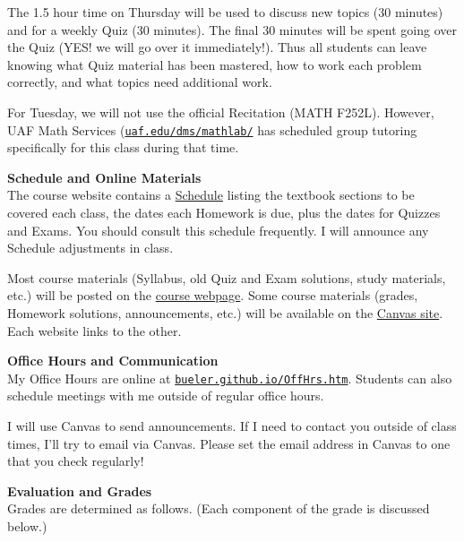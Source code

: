 \documentclass[12pt]{article}
\renewcommand{\emph}[1]{\textsf{\textbf{#1}}}
\newcommand{\localhead}[1]{\par\smallskip\textbf{#1} \smallskip\nobreak\\}%
\def\heading#1{\localhead{\large\emph{#1}}}
\begin{document}
The 1.5 hour time on Thursday will be used to discuss new topics (30 minutes) and for a weekly Quiz (30 minutes).  The final 30 minutes will be spent going over the Quiz (YES! we will go over it immediately!).  Thus all students can leave knowing what Quiz material has been mastered, how to work each problem correctly, and what topics need additional work. 

For Tuesday, we will not use the official Recitation (MATH F252L).  However, UAF Math Services (\href{https://uaf.edu/dms/mathlab/}{\texttt{uaf.edu/dms/mathlab/}} has scheduled group tutoring specifically for this class during that time.


\clearpage \newpage

\strut \vspace{-12pt}
\heading{Schedule and Online Materials}
The course website contains a \href{https://bueler.github.io/calc2/schedule.pdf}{Schedule} listing the textbook sections to be covered each class, the dates each Homework is due, plus the dates for Quizzes and Exams. You should consult this schedule frequently.  I will announce any Schedule adjustments in class.

Most course materials (Syllabus, old Quiz and Exam solutions, study materials, etc.) will be posted on the \href{https://bueler.github.io/calc2/}{course webpage}.  Some course materials (grades, Homework solutions, announcements, etc.) will be available on the \href{https://canvas.alaska.edu/courses/7049}{Canvas site}.  Each website links to the other.


\heading{Office Hours and Communication}
My Office Hours are online at \href{http://bueler.github.io/OffHrs.htm}{\texttt{bueler.github.io/OffHrs.htm}}.  Students can also schedule meetings with me outside of regular office hours. 

I will use Canvas to send announcements.  If I need to contact you outside of class times, I'll try to email via Canvas.  Please set the email address in Canvas to one that you check regularly!


\heading{Evaluation and Grades}
Grades are determined as follows.  (Each component of the grade is discussed below.)
 
\end{document}
